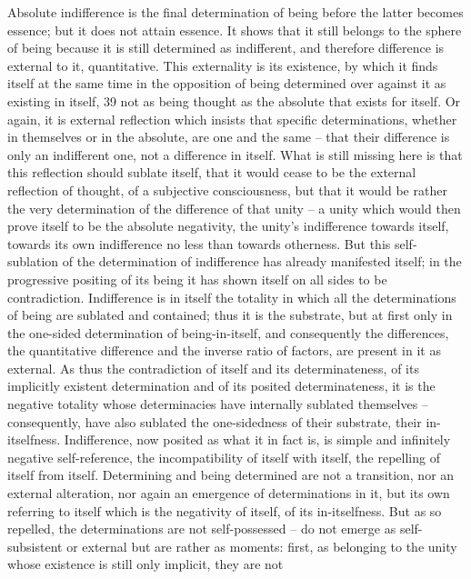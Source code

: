 Absolute indifference is the final determination of being before the latter
becomes essence; but it does not attain essence. It shows that it still belongs to
the sphere of being because it is still determined as indifferent, and therefore
difference is external to it, quantitative. This externality is its existence, by
which it finds itself at the same time in the opposition of being determined
over against it as existing in itself, 39 not as being thought as the absolute that
exists for itself. Or again, it is external reflection which insists that specific
determinations, whether in themselves or in the absolute, are one and the
same – that their difference is only an indifferent one, not a difference in
itself. What is still missing here is that this reflection should sublate itself,
that it would cease to be the external reflection of thought, of a subjective
consciousness, but that it would be rather the very determination of the
difference of that unity – a unity which would then prove itself to be the
absolute negativity, the unity’s indifference towards itself, towards its own
indifference no less than towards otherness.
But this self-sublation of the determination of indifference has already
manifested itself; in the progressive positing of its being it has shown itself
on all sides to be contradiction. Indifference is in itself the totality in which
all the determinations of being are sublated and contained; thus it is the
substrate, but at first only in the one-sided determination of being-in-itself,
and consequently the differences, the quantitative difference and the inverse
ratio of factors, are present in it as external. As thus the contradiction of
itself and its determinateness, of its implicitly existent determination and of
its posited determinateness, it is the negative totality whose determinacies
have internally sublated themselves – consequently, have also sublated
the one-sidedness of their substrate, their in-itselfness. Indifference, now
posited as what it in fact is, is simple and infinitely negative self-reference,
the incompatibility of itself with itself, the repelling of itself from itself.
Determining and being determined are not a transition, nor an external
alteration, nor again an emergence of determinations in it, but its own
referring to itself which is the negativity of itself, of its in-itselfness.
But as so repelled, the determinations are not self-possessed – do not
emerge as self-subsistent or external but are rather as moments: first, as
belonging to the unity whose existence is still only implicit, they are not
